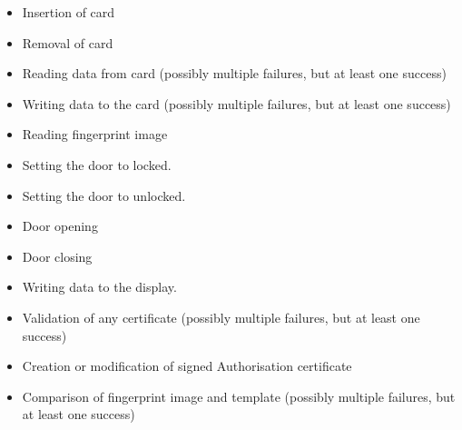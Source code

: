 {\footnotesize \sf
\begin{itemize}
\item	Insertion of card
\item	Removal of card
\item	Reading data from card (possibly multiple failures, but at least one success)
\item	Writing data to the card (possibly multiple failures, but at least one success)
\item	Reading fingerprint image
\item	Setting the door to locked.
\item	Setting the door to unlocked.
\item	Door opening
\item	Door closing
\item	Writing data to the display.
\item	Validation of any certificate (possibly multiple failures, but at least one success)
\item	Creation or modification of signed Authorisation certificate
\item	Comparison of fingerprint image and template (possibly multiple failures, but at least one success)
\end{itemize}
}

